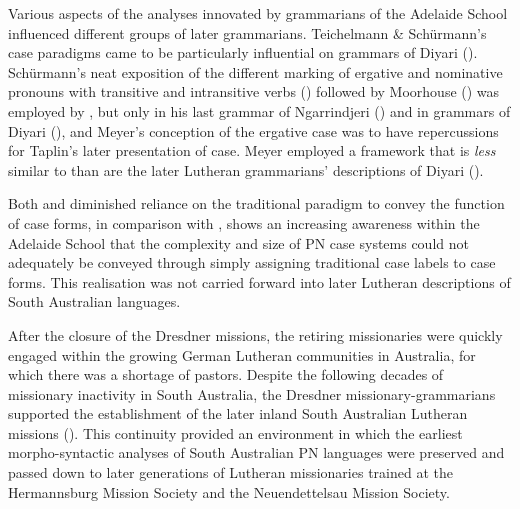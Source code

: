 Various aspects of the analyses innovated by grammarians of the Adelaide School influenced different groups of later grammarians. Teichelmann \& Schürmann’s case paradigms came to be particularly influential on grammars of Diyari (). Schürmann’s neat exposition of the different marking of ergative and nominative pronouns with transitive and intransitive verbs () followed by Moorhouse () was employed by \citet{taplin_grammar_1878}, but only in his last grammar of Ngarrindjeri () and in grammars of Diyari (), and Meyer’s conception of the ergative case was to have repercussions for Taplin’s later presentation of case. Meyer employed a framework that is \textit{less} similar to  than are the later Lutheran grammarians' descriptions of Diyari ().

Both  and  diminished reliance on the traditional paradigm to convey the function of case forms, in comparison with \citet{teichelmann_outlines_1840}, shows an increasing awareness within the Adelaide School that the complexity and size of PN case systems could not adequately be conveyed through simply assigning traditional case labels to case forms. This realisation was not carried forward into later Lutheran descriptions of South Australian languages.

After the closure of the Dresdner missions, the retiring missionaries were quickly engaged within the growing German Lutheran communities in Australia, for which there was a shortage of pastors. Despite the following decades of missionary inactivity in South Australia, the Dresdner missionary-grammarians supported the establishment of the later inland South Australian Lutheran missions (). This continuity provided an environment in which the earliest morpho-syntactic analyses of South Australian PN languages were preserved and passed down to later generations of Lutheran missionaries trained at the Hermannsburg Mission Society and the Neuendettelsau Mission Society.

